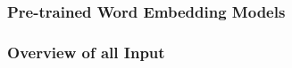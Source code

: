 \documentclass[11pt,a4paper]{article}
\begin{document}
\subsubsection{Pre-trained Word Embedding Models}


\subsubsection{Overview of all Input}

%
\end{document}
